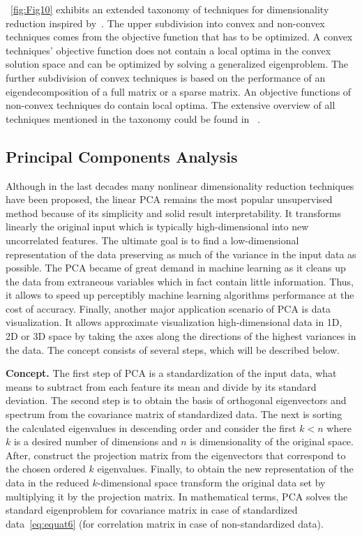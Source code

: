 ~\autoref{fig:Fig10} exhibits an extended taxonomy of techniques for dimensionality reduction inspired by~\cite{van2009dimensionality}. The upper subdivision into convex and non-convex techniques comes from the objective function that has to be optimized. A convex techniques' objective function does not contain a local optima in the convex solution space and can be optimized by solving a generalized eigenproblem. The further subdivision of convex techniques is based on the performance of an eigendecomposition of a full matrix or a sparse matrix. An objective functions of non-convex techniques do contain local optima. The extensive overview of all techniques mentioned in the taxonomy could be found in ~\cite{van2009dimensionality}.

\subsection{Principal Components Analysis}
Although in the last decades many nonlinear dimensionality reduction techniques have been proposed, the linear PCA remains the most popular unsupervised method because of its simplicity and solid result interpretability. It transforms linearly the original input which is typically high-dimensional into new uncorrelated features. The ultimate goal is to find a low-dimensional representation of the data preserving as much of the variance in the input data as possible. The PCA became of great demand in machine learning as it cleans up the data from extraneous variables which in fact contain little information. Thus, it allows to speed up perceptibly machine learning algorithms performance at the cost of accuracy. Finally, another major application scenario of PCA is data visualization. It allows approximate visualization high-dimensional data in 1D, 2D or 3D space by taking the axes along the directions of the highest variances in the data. The concept consists of several steps, which will be described below.

\textbf{Concept. }
The first step of PCA is a standardization of the input data, what means to subtract from each feature its mean and divide by its standard deviation. The second step is to obtain the basis of orthogonal eigenvectors and spectrum from the covariance matrix of standardized data. The next is sorting the calculated eigenvalues in descending order and consider the first $k < n$ where $k$ is a desired number of dimensions and $n$ is dimensionality of the original space. After, construct the projection matrix from the eigenvectors that correspond to the chosen ordered $k$ eigenvalues. Finally, to obtain the new representation of the data in the reduced $k$-dimensional space transform the original data set by multiplying it by the projection matrix.
In mathematical terms, PCA solves the standard eigenproblem for covariance matrix in case of standardized data~\autoref{eq:equat6} (for correlation matrix in case of non-standardized data).

